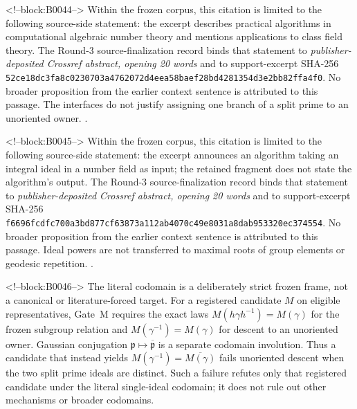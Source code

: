 \documentclass[11pt,a4paper]{article}
\begin{document}
<!--block:B0044-->
Within the frozen corpus, this citation is limited to the following source-side statement: the excerpt describes practical algorithms in computational algebraic number theory and mentions applications to class field theory. The Round-3 source-finalization record binds that statement to \emph{publisher-deposited Crossref abstract, opening 20 words} and to support-excerpt SHA-256 \texttt{52ce18dc\allowbreak{}3fa8c023\allowbreak{}0703a476\allowbreak{}2072d4ee\allowbreak{}a58baef2\allowbreak{}8bd42813\allowbreak{}54d3e2bb\allowbreak{}82ffa4f0}. No broader proposition from the earlier context sentence is attributed to this passage. The interfaces do not justify assigning one branch of a split prime to an unoriented owner.
\citep{P29-S21}.

<!--block:B0045-->
Within the frozen corpus, this citation is limited to the following source-side statement: the excerpt announces an algorithm taking an integral ideal in a number field as input; the retained fragment does not state the algorithm's output. The Round-3 source-finalization record binds that statement to \emph{publisher-deposited Crossref abstract, opening 20 words} and to support-excerpt SHA-256 \texttt{f6696fcd\allowbreak{}fc700a3b\allowbreak{}d877cf63\allowbreak{}873a112a\allowbreak{}b4070c49\allowbreak{}e8031a8d\allowbreak{}ab953320\allowbreak{}ec374554}. No broader proposition from the earlier context sentence is attributed to this passage. Ideal powers are not transferred to maximal roots of group elements or geodesic repetition.
\citep{P29-S22}.

<!--block:B0046-->
The literal codomain is a deliberately strict frozen frame, not a canonical or literature-forced target. For a registered candidate \(M\) on eligible representatives, Gate~M requires the exact laws \(M(h\gamma h^{-1})=M(\gamma)\) for the frozen subgroup relation and \(M(\gamma^{-1})=M(\gamma)\) for descent to an unoriented owner. Gaussian conjugation \(\mathfrak p\mapsto\overline{\mathfrak p}\) is a separate codomain involution. Thus a candidate that instead yields \(M(\gamma^{-1})=\overline{M(\gamma)}\) fails unoriented descent when the two split prime ideals are distinct. Such a failure refutes only that registered candidate under the literal single-ideal codomain; it does not rule out other mechanisms or broader codomains.
\end{document}
